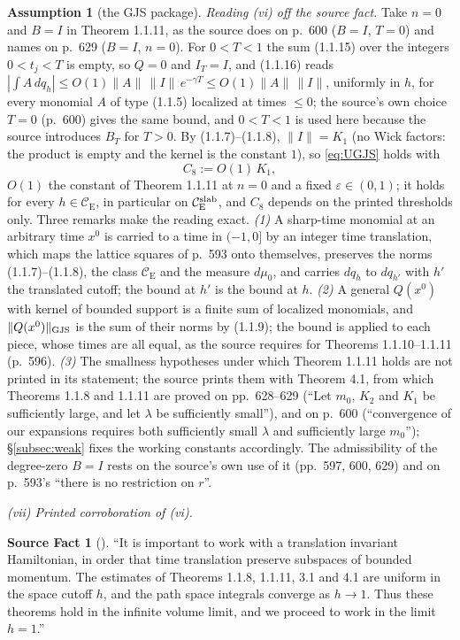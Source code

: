\documentclass[11pt,a4paper]{article}
\theoremstyle{plain}
\theoremstyle{definition}
\newtheorem{srcfact}[theorem]{Source Fact}
\newtheorem{assumption}{Assumption}
\theoremstyle{plain}
\theoremstyle{definition}
\newcommand{\CE}{\mathcal{C}_{\mathrm E}}
\begin{document}
\begin{assumption}[the GJS package]
\emph{Reading (vi) off the source fact.}  Take $n=0$ and $B=I$ in Theorem 1.1.11, as the
source does on p.~600 ($B=I$, $T=0$) and names on p.~629 ($B=I$, $n=0$).  For $0<T<1$ the sum (1.1.15) over the integers
$0<t_j<T$ is empty, so $Q=0$ and $I_T=I$, and (1.1.16) reads
$|\int A\,dq_h|\le O(1)\|A\|\,\|I\|\,e^{-\gamma T}\le O(1)\|A\|\,\|I\|$, uniformly in $h$,
for every monomial $A$ of type (1.1.5) localized at times $\le0$; the source's own choice
$T=0$ (p.~600) gives the same bound, and $0<T<1$ is used here because the source introduces
$B_T$ for $T>0$.  By (1.1.7)--(1.1.8), $\|I\|=K_1$ (no Wick factors: the product is empty and the kernel is
the constant $1$), so
\eqref{eq:UGJS} holds with
\[
 C_8:=O(1)\,K_1 ,
\]
$O(1)$ the constant of Theorem 1.1.11 at $n=0$ and a fixed $\varepsilon\in(0,1)$; it holds for
every $h\in\CE$, in particular on $\CE^{\rm slab}$, and $C_8$ depends on the printed
thresholds only.  Three remarks make the reading exact.  \emph{(1)} A sharp-time monomial at
an arbitrary time $x^0$ is carried to a time in $(-1,0]$ by an integer time translation,
which maps the lattice squares of p.~593 onto themselves, preserves the norms
(1.1.7)--(1.1.8), the class $\CE$ and the measure $d\mu_0$, and carries $dq_h$ to $dq_{h'}$
with $h'$ the translated cutoff; the bound at $h'$ is the bound at $h$.  \emph{(2)} A general
$Q(x^0)$ with kernel of bounded support is a finite sum of localized monomials, and
$\|Q(x^0)\|_{\rm GJS}$ is the sum of their norms by (1.1.9); the bound is applied to each
piece, whose times are all equal, as the source requires for Theorems 1.1.10--1.1.11
(p.~596).  \emph{(3)} The smallness
hypotheses under which Theorem 1.1.11 holds are not printed in its statement; the source
prints them with Theorem 4.1, from which Theorems 1.1.8 and 1.1.11 are proved on pp.~628--629
(``Let $m_0$, $K_2$ and $K_1$ be sufficiently large, and let $\lambda$ be sufficiently
small''), and on p.~600 (``convergence of our expansions requires both sufficiently small
$\lambda$ and sufficiently large $m_0$''); \S\ref{subsec:weak} fixes the working constants
accordingly.  The admissibility of the degree-zero $B=I$ rests on the source's own use of it
(pp.~597, 600, 629) and on p.~593's ``there is no restriction on $r$''.

\emph{(vii) Printed corroboration of (vi).}
\begin{srcfact}[{\cite[p.~629, \S4]{GJS}}]\label{sf:printed}
``It is important to work with a translation invariant Hamiltonian, in order that time
translation preserve subspaces of bounded momentum. The estimates of Theorems 1.1.8, 1.1.11,
3.1 and 4.1 are uniform in the space cutoff $h$, and the path space integrals converge as
$h\to1$. Thus these theorems hold in the infinite volume limit, and we proceed to work in the
limit $h=1$.''
\end{srcfact}


\end{assumption}
\end{document}
